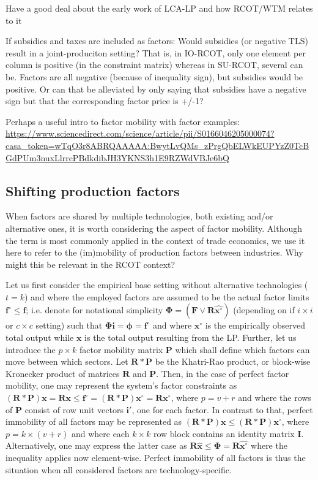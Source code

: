 \documentclass{article}
\begin{document}
\begin{refsection}
Have a good deal about the early work of LCA-LP and how RCOT/WTM relates to it

If subsidies and taxes are included as factors: Would subsidies (or negative TLS) result in a joint-produciton setting? That is, in IO-RCOT, only one element per column is positive (in the constraint matrix) whereas in SU-RCOT, several can be. Factors are all negative (because of inequality sign), but subsidies would be positive. Or can that be alleviated by only saying that subsidies have a negative sign but that the corresponding factor price is +/-1?

Perhaps a useful intro to factor mobility with factor examples: \url{https://www.sciencedirect.com/science/article/pii/S0166046205000074?casa_token=wTqO3r8ABRQAAAAA:BwytLvQMs_zPrgQbELWkEUPYzZ0TcBGdPUm3nuxLlrrcPBdkdibJH3YKNS3h1E9RZWdVBJe6bQ}

\subsection{Shifting production factors}

When factors are shared by multiple technologies, both existing and/or alternative ones, it is worth considering the aspect of factor mobility. Although the term is most commonly applied in the context of trade economics, we use it here to refer to the (im)mobility of production factors between industries. Why might this be relevant in the RCOT context? 

Let us first consider the empirical base setting without alternative technologies ($t = k$) and where the employed factors are assumed to be the actual factor limits $\bm{f}^{\circ} \le \bm{f}$; i.e. denote for notational simplicity $\bm{\Phi} = (\bm{F} \lor \bm{R} \widehat{\bm{x}^{\circ}})$ (depending on if $i \times i$ or $c \times c$ setting) such that $\bm{\Phi i} = \bm{\phi} = \bm{f}^{\circ}$ and where $\bm{x}^{\circ}$ is the empirically observed total output while $\bm{x}$ is the total output resulting from the LP. Further, let us introduce the $p \times k$ factor mobility matrix $\bm{P}$ which shall define which factors can move between which sectors. Let $\bm{R} \ast \bm{P}$ be the Khatri-Rao product, or block-wise Kronecker product of matrices $\bm{R}$ and $\bm{P}$. Then, in the case of perfect factor mobility, one may represent the system's factor constraints as $(\bm{R} \ast \bm{P}) \bm{x} = \bm{R} \bm{x} \le \bm{f}^{\circ} = (\bm{R} \ast \bm{P}) \bm{x}^{\circ} = \bm{R} \bm{x}^{\circ}$, where $p = v + r$ and where the rows of $\bm{P}$ consist of row unit vectors $\bm{i}'$, one for each factor. In contrast to that, perfect immobility of all factors may be represented as $(\bm{R} \ast \bm{P}) \bm{x} \le (\bm{R} \ast \bm{P}) \bm{x}^{\circ}$, where $p = k \times (v + r)$ and where each $k \times k$ row block contains an identity matrix $\bm{I}$. Alternatively, one may express the latter case as $\bm{R} \widehat{\bm{x}} \le \bm{\Phi} = \bm{R} \widehat{\bm{x}^{\circ}}$ where the inequality applies now element-wise. Perfect immobility of all factors is thus the situation when all considered factors are technology-specific.


\end{refsection}
\end{document}
